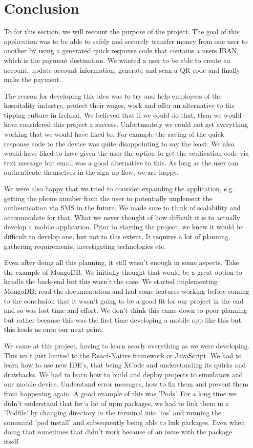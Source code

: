 \chapter{Conclusion}
To for this section, we will recount the purpose of the project. The goal of this application was to be able to safely and securely transfer money from one user to another by using a generated quick response code that contains a users IBAN, which is the payment destination. We wanted a user to be able to create an account, update account information, generate and scan a QR code and finally make the payment. 

The reason for developing this idea was to try and help employees of the hospitality industry, protect their wages, work and offer an alternative to the tipping culture in Ireland. We believed that if we could do that, than we would have considered this project a success. Unfortunately we could not get everything working that we would have liked to. For example the saving of the quick response code to the device was quite disappointing to say the least. We also would have liked to have given the user the option to get the verification code via text message but email was a good alternative to this. As long as the user can authenticate themselves in the sign up flow, we are happy.

We were also happy that we tried to consider expanding the application, e.g. getting the phone number from the user to potentially implement the authentication via SMS in the future. We made sure to think of scalability and accommodate for that. What we never thought of how difficult it is to actually develop a mobile application. Prior to starting the project, we knew it would be difficult to develop one, but not to this extent. It requires a lot of planning, gathering requirements, investigating technologies etc.

Even after doing all this planning, it still wasn't enough in some aspects. Take the example of MongoDB. We initially thought that would be a great option to handle the back-end but this wasn't the case. We started implementing MongoDB, read the documentation and had some features working before coming to the conclusion that it wasn't going to be a good fit for our project in the end and so was lost time and effort. We don't think this came down to poor planning but rather because this was the first time developing a mobile app like this but this leads us onto our next point.

We came at this project, having to learn nearly everything as we were developing. This isn't just limited to the React-Native framework or JavaScript. We had to learn how to use new IDE's, that being XCode and understanding its quirks and drawbacks. We had to learn how to build and deploy projects to simulators and our mobile device. Understand error messages, how to fix them and prevent them from happening again. A good example of this was 'Pods'. For a long time we didn't understand that for a lot of npm packages, we had to link them in a 'Podfile' by changing directory in the terminal into 'ios' and running the command 'pod install' and subsequently being able to link packages. Even when doing that sometimes that didn't work because of an issue with the package itself. 

